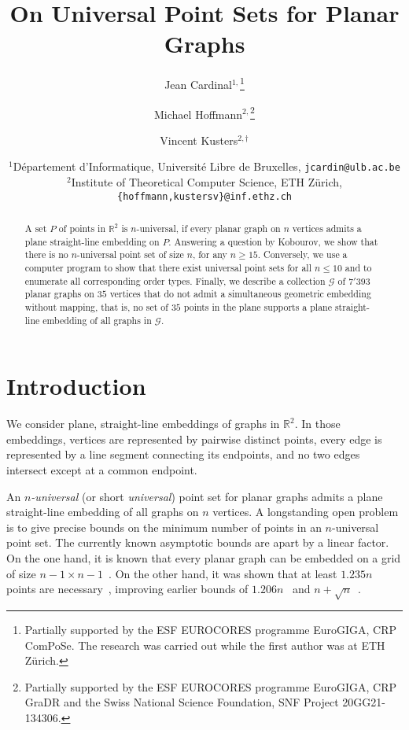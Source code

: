 \documentclass[11pt]{article}
\newcommand{\R}{\ensuremath{\mathds R}}
\begin{document}
\title{On Universal Point Sets for Planar Graphs}

\author{Jean Cardinal$^{1,}$\thanks{Partially supported by the ESF EUROCORES
    programme EuroGIGA, CRP ComPoSe. The research was carried out while the
    first author was at ETH Z\"urich.} \and Michael
  Hoffmann$^{2,}$\thanks{Partially supported by the ESF EUROCORES programme
    EuroGIGA, CRP GraDR and the Swiss National Science Foundation, SNF Project
    20GG21-134306.} \and Vincent Kusters$^{2,\dag}$}

\date{\small $^1$D\'epartement d'Informatique, Universit\'e Libre de
  Bruxelles, \texttt{jcardin@ulb.ac.be}\\
  $^2$Institute of Theoretical Computer Science, ETH Z\"urich,
  \texttt{\{hoffmann,kustersv\}@inf.ethz.ch}}



\maketitle \begin{abstract}
  A set $P$ of points in $\R^2$ is $n$-universal, if every planar graph on $n$
  vertices admits a plane straight-line embedding on $P$. Answering a question
  by Kobourov, we show that there is no $n$-universal point set of size $n$, for
  any $n\ge 15$. Conversely, we use a computer program to show that there exist
  universal point sets for all $n\le 10$ and to enumerate all corresponding
  order types. Finally, we describe a collection $\mathcal{G}$ of $7'393$ planar
  graphs on $35$ vertices that do not admit a simultaneous geometric embedding
  without mapping, that is, no set of $35$ points in the plane supports a plane
  straight-line embedding of all graphs in $\mathcal{G}$.
\end{abstract}
\sloppy

\section{Introduction}
\label{sec:introduction}

We consider plane, straight-line embeddings of graphs in $\R^2$. In those
embeddings, vertices are represented by pairwise distinct points, every edge is
represented by a line segment connecting its endpoints, and no two edges
intersect except at a common endpoint.

An {\em $n$-universal} (or short \emph{universal}) point set for planar graphs
admits a plane straight-line embedding of all graphs on $n$ vertices. A
longstanding open problem is to give precise bounds on the minimum number of
points in an $n$-universal point set. The currently known asymptotic bounds are
apart by a linear factor. On the one hand, it is known that every planar graph
can be embedded on a grid of size $n-1\times
n-1$~\cite{fpp-hdpgg-90,s-epgg-90}. On the other hand, it was shown that at
least $1.235n$ points are necessary~\cite{Kurowski04}, improving earlier bounds
of $1.206n$~\cite{ck-lbsuspg-89} and $n+\sqrt{n}$~\cite{fpp-hdpgg-90}.
\end{document}
